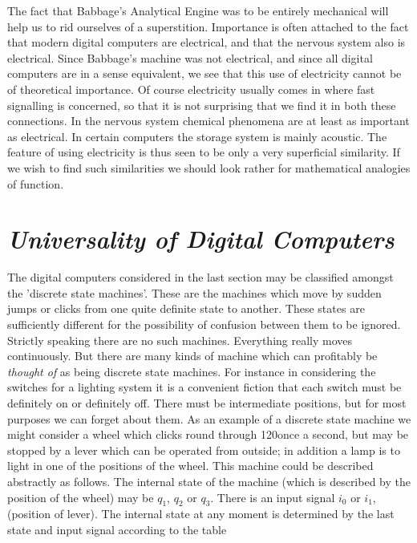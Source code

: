 \documentclass[12pt]{article}
\begin{document}
    The fact that Babbage's Analytical Engine was to be entirely mechanical will help us to rid ourselves of a superstition. Importance is often attached to the fact that modern digital computers are electrical, and that the nervous system also is electrical. Since Babbage's machine was not electrical, and since all digital computers are in a sense equivalent, we see that this use of electricity cannot be of theoretical importance. Of course electricity usually comes in where fast signalling is concerned, so that it is not surprising that we find it in both these connections. In the nervous system chemical phenomena are at least as important as electrical. In certain computers the storage system is mainly acoustic. The feature of using electricity is thus seen to be only a very superficial similarity. If we wish to find such similarities we should look rather for mathematical analogies of function.

    \section{\textit{Universality of Digital Computers}}
    The digital computers considered in the last section may be classified amongst the 'discrete state machines'. These are the machines which move by sudden jumps or clicks from one quite definite state to another. These states are sufficiently different for the possibility of confusion between them to be ignored. Strictly speaking there are no such machines. Everything really moves continuously. But there are many kinds of machine which can profitably be \textit{thought of} as being discrete state machines. For instance in considering the switches for a lighting system it is a convenient fiction that each switch must be definitely on or definitely off. There must be intermediate positions, but for most purposes we can forget about them. As an example of a discrete state machine we might consider a wheel which clicks round through 120\degree once a second, but may be stopped by a lever which can be operated from outside; in addition a lamp is to light in one of the positions of the wheel. This machine could be described abstractly as follows. The internal state of the machine (which is described by the position of the wheel) may be $q_1$, $q_2$ or $q_3$. There is an input signal $i_0$ or $i_1$, (position of lever). The internal state at any moment is determined by the last state and input signal according to the table
\end{document}
